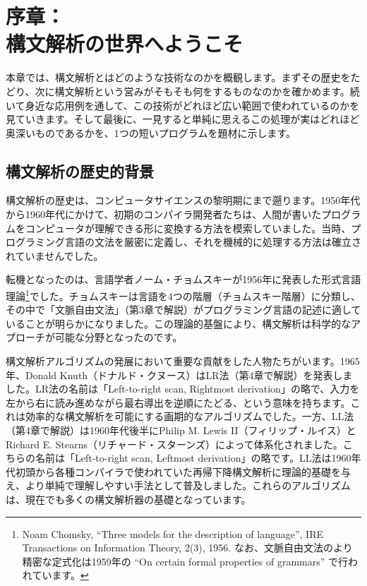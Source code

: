 \thispagestyle{empty}
\chapter*{序章：\\構文解析の世界へようこそ}\label{preface}

本章では、構文解析とはどのような技術なのかを概観します。まずその歴史をたどり、次に構文解析という営みがそもそも何をするものなのかを確かめます。続いて身近な応用例を通して、この技術がどれほど広い範囲で使われているのかを見ていきます。そして最後に、一見すると単純に思えるこの処理が実はどれほど奥深いものであるかを、1つの短いプログラムを題材に示します。

\section*{構文解析の歴史的背景}\label{0.1}

構文解析の歴史は、コンピュータサイエンスの黎明期にまで遡ります。1950年代から1960年代にかけて、初期のコンパイラ開発者たちは、人間が書いたプログラムをコンピュータが理解できる形に変換する方法を模索していました。当時、プログラミング言語の文法を厳密に定義し、それを機械的に処理する方法は確立されていませんでした。

転機となったのは、言語学者ノーム・チョムスキーが1956年に発表した形式言語理論\footnote{Noam
  Chomsky, ``Three models for the description of language'', IRE
  Transactions on Information Theory, 2(3), 1956.
  なお、文脈自由文法のより精密な定式化は1959年の ``On certain formal
  properties of grammars'' で行われています。}でした。チョムスキーは言語を4つの階層（チョムスキー階層）に分類し、その中で「文脈自由文法」（第3章で解説）がプログラミング言語の記述に適していることが明らかになりました。この理論的基盤により、構文解析は科学的なアプローチが可能な分野となったのです。

構文解析アルゴリズムの発展において重要な貢献をした人物たちがいます。1965年、Donald
Knuth（ドナルド・クヌース）はLR法（第4章で解説）を発表しました。LR法の名前は「Left-to-right
scan, Rightmost
derivation」の略で、入力を左から右に読み進めながら最右導出を逆順にたどる、という意味を持ちます。これは効率的な構文解析を可能にする画期的なアルゴリズムでした。一方、LL法（第4章で解説）は1960年代後半にPhilip
M. Lewis II（フィリップ・ルイス）とRichard E.
Stearns（リチャード・スターンズ）によって体系化されました。こちらの名前は「Left-to-right
scan, Leftmost
derivation」の略です。LL法は1960年代初頭から各種コンパイラで使われていた再帰下降構文解析に理論的基礎を与え、より単純で理解しやすい手法として普及しました。これらのアルゴリズムは、現在でも多くの構文解析器の基礎となっています。

